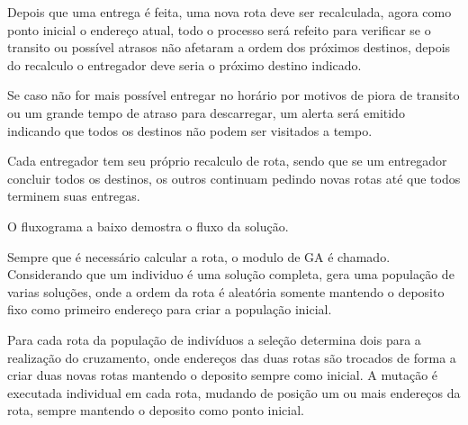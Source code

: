 Depois que uma entrega é feita, uma nova rota deve ser recalculada, agora como ponto inicial o endereço atual, todo o processo será refeito para verificar se o transito ou possível atrasos não afetaram a ordem dos próximos destinos, depois do recalculo o entregador deve seria o próximo destino indicado.

Se caso não for mais possível entregar no horário por motivos de piora de transito ou um grande tempo de atraso para descarregar, um alerta será emitido indicando que todos os destinos não podem ser visitados a tempo.

Cada entregador tem seu próprio recalculo de rota, sendo que se um entregador concluir todos os destinos, os outros continuam pedindo novas rotas até que todos terminem suas entregas.

O fluxograma a baixo demostra o fluxo da solução.

\begin{center}
    \label{fig:FluxoSoftware}
\end{center}

Sempre que é necessário calcular a rota, o modulo de GA é chamado. Considerando que um individuo é uma solução completa, gera uma população de varias soluções, onde a ordem da rota é aleatória somente mantendo o deposito fixo como primeiro endereço para criar a população inicial.

Para cada rota da população de indivíduos a seleção determina dois para a realização do cruzamento, onde endereços das duas rotas são trocados de forma a criar duas novas rotas mantendo o deposito sempre como inicial. A mutação é executada individual em cada rota, mudando de posição um ou mais endereços da rota, sempre mantendo o deposito como ponto inicial.

